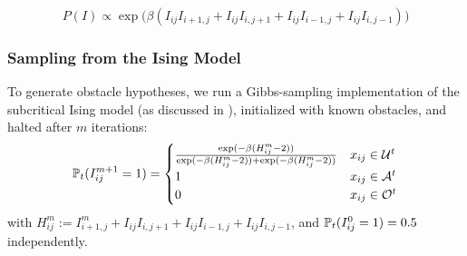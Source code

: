 \begin{equation}
P(I) \propto \exp\bigl(\beta (I_{ij}I_{i+1,j} + I_{ij}I_{i,j+1} + I_{ij}I_{i-1,j} + I_{ij}I_{i,j-1})  \bigr)
\end{equation}

\subsubsection{Sampling from the Ising Model\label{section: monte carlo}}
To generate obstacle hypotheses, we run a Gibbs-sampling implementation 
of the subcritical Ising model (as discussed in \cite{geyer91}), initialized with known obstacles,
and halted after $m$ iterations:
\begin{gather}
\mathbb{P}_t(I_{ij}^{m+1}=1) = 
\begin{cases}
\frac{\exp(-\beta(H_{ij}^m - 2))}{\exp(-\beta(H_{ij}^m - 2)) + \exp(-\beta(H_{ij}^m - 2))} & x_{ij}\in\mathcal{U}^t\\
1 & x_{ij}\in\mathcal{A}^t\\
0 & x_{ij}\in\mathcal{O}^t
\end{cases}
\end{gather}
with $H^m_{ij} := I^m_{i+1,j} + I_{ij}I_{i,j+1} + I_{ij}I_{i-1,j} + I_{ij}I_{i,j-1}$, and
$\mathbb{P}_t(I^0_{ij}=1)=0.5$ independently.

